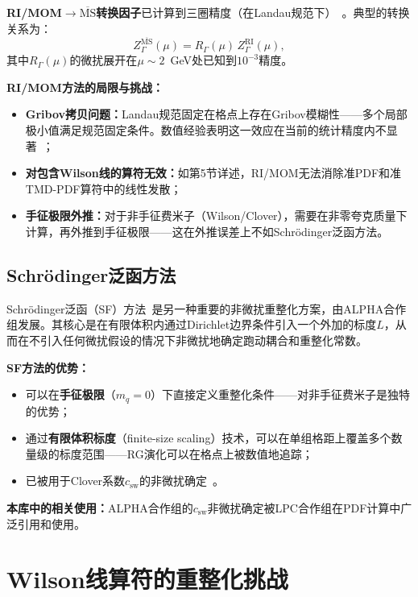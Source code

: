 \documentclass[12pt,a4paper]{ctexart}
\theoremstyle{definition}
\begin{document}
\textbf{RI/MOM$\to\overline{\text{MS}}$转换因子}已计算到三圈精度（在Landau规范下）~\cite{Chetyrkin2000,Gracey2003}。典型的转换关系为：
\begin{equation}
Z_\Gamma^{\overline{\text{MS}}}(\mu) = R_\Gamma(\mu) \, Z_\Gamma^{\text{RI}}(\mu),
\label{eq:RI_to_MS}
\end{equation}
其中$R_\Gamma(\mu)$的微扰展开在$\mu \sim 2$~GeV处已知到$10^{-3}$精度。

\textbf{RI/MOM方法的局限与挑战：}
\begin{itemize}
    \item \textbf{Gribov拷贝问题：}Landau规范固定在格点上存在Gribov模糊性——多个局部极小值满足规范固定条件。数值经验表明这一效应在当前的统计精度内不显著~\cite{GattringerLang2010}；
    \item \textbf{对包含Wilson线的算符无效：}如第5节详述，RI/MOM无法消除准PDF和准TMD-PDF算符中的线性发散；
    \item \textbf{手征极限外推：}对于非手征费米子（Wilson/Clover），需要在非零夸克质量下计算，再外推到手征极限——这在外推误差上不如Schr\"odinger泛函方法。
\end{itemize}

\subsection{Schr\"odinger泛函方法}

Schr\"odinger泛函（SF）方法~\cite{Luscher1996SF}是另一种重要的非微扰重整化方案，由ALPHA合作组发展。其核心是在有限体积内通过Dirichlet边界条件引入一个外加的标度$L$，从而在不引入任何微扰假设的情况下非微扰地确定跑动耦合和重整化常数。

\textbf{SF方法的优势：}
\begin{itemize}
    \item 可以在\textbf{手征极限}（$m_q=0$）下直接定义重整化条件——对非手征费米子是独特的优势；
    \item 通过\textbf{有限体积标度}（finite-size scaling）技术，可以在单组格距上覆盖多个数量级的标度范围——RG演化可以在格点上被数值地追踪；
    \item 已被用于Clover系数$c_{\text{sw}}$的非微扰确定~\cite{Luscher1996SF}。
\end{itemize}

\textbf{本库中的相关使用：}ALPHA合作组的$c_{\text{sw}}$非微扰确定被LPC合作组在PDF计算中广泛引用和使用。

\section{Wilson线算符的重整化挑战}
\end{document}
